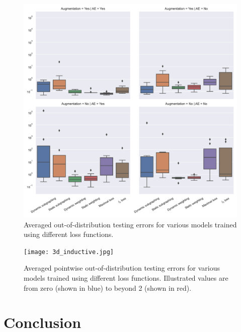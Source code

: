 \documentclass[12pt,a4paper]{report}
\begin{document}
\begin{figure}\centering
\includegraphics[width=1\linewidth,keepaspectratio]{3d_boxplot.pdf}
\caption{Averaged out-of-distribution testing errors for various models trained using different loss functions.}\label{fig:3d_boxplot}
\end{figure}

\begin{figure}\centering
\texttt{[image: 3d\_inductive.jpg]}
\caption{Averaged pointwise out-of-distribution testing errors for various models trained using different loss functions. Illustrated values are from zero (shown in blue) to beyond 2 (shown in red).}\label{fig:3d_inductive}
\end{figure}

\chapter{Conclusion}

\end{document}
